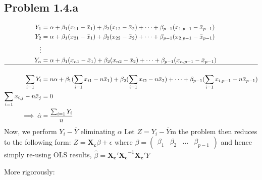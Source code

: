 \documentclass[a4paper]{article}
\begin{document}
\subsection*{Problem 1.4.a}

\begin{align*}
Y_1 &= \alpha + \beta_1(x_{11}-\bar{x}_1) + \beta_2(x_{12} - \bar{x}_2) + \dots + \beta_{p-1}(x_{1,p-1}-\bar{x}_{p-1})\\
Y_2 &= \alpha + \beta_1(x_{21}-\bar{x}_1) + \beta_2(x_{22} - \bar{x}_2) + \dots + \beta_{p-1}(x_{2,p-1}-\bar{x}_{p-1})\\
\vdots \\
Y_n &= \alpha + \beta_1(x_{n1}-\bar{x}_1) + \beta_2(x_{n2} - \bar{x}_2) + \dots + \beta_{p-1}(x_{n,p-1}-\bar{x}_{p-1})\\
\hline\\
\sum_{i=1}Y_i &= n\alpha + \beta_1(\sum_{i=1}x_{i1}-n\bar{x}_1) + \beta_2(\sum_{i=1}x_{i2}-n\bar{x}_2) + \dots + \beta_{p-1}(\sum_{i=1}x_{i,p-1}-n\bar{x}_{p-1})\\
\sum_{i=1}x_{i,j}-n\bar{x}_j &= 0\\
\implies \hat{\alpha} &= \frac{\sum_{i=1}Y_i}{n}
\end{align*}
Now, we perform $Y_i-\bar{Y}$ eliminating $\alpha$ Let $Z=Y_i-\bar{Y}$m the problem then reduces to the following form: $Z = \mathbf{X_c}\beta + \epsilon$ where $\beta = \begin{pmatrix}
\beta_1 & \beta_2 & \dots & \beta_{p-1}
\end{pmatrix}$ and hence simply re-using OLS results, $\hat{\beta} =\mathbf{X_c'X_c}^{-1}\mathbf{X_c'}Y$

More rigorously:
\end{document}
